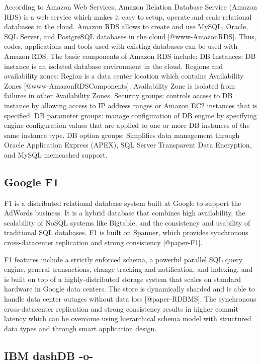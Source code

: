 According to Amazon Web Services, Amazon Relation Database Service
(Amazon RDS) is a web service which makes it easy to setup, operate
and scale relational databases in the cloud. Amazon RDS allows to
create and use MySQL, Oracle, SQL Server, and PostgreSQL databases in
the cloud [@www-AmazonRDS]. Thus, codes, applications and tools
used with existing databases can be used with Amazon RDS. The basic
components of Amazon RDS include: DB Instances: DB instance is an
isolated database environment in the cloud. Regions and availability
zones: Region is a data center location which contains Availability
Zones [@www-AmazonRDSComponents]. Availability Zone is isolated
from failures in other Availability Zones. Security groups: controls
access to DB instance by allowing access to IP address ranges or
Amazon EC2 instances that is specified. DB parameter groups: manage
configuration of DB engine by specifying engine configuration values
that are applied to one or more DB instances of the same instance
type. DB option groups: Simplifies data management through Oracle
Application Express (APEX), SQL Server Transparent Data Encryption,
and MySQL memcached support.



     
\subsection{Google F1}

F1 is a distributed relational database system built at Google to
support the AdWords business. It is a hybrid database that combines
high availability, the scalability of NoSQL systems like Bigtable, and
the consistency and usability of traditional SQL databases. F1 is
built on Spanner, which provides synchronous cross-datacenter
replication and strong consistency [@paper-F1].
     
F1 features include a strictly enforced schema, a powerful parallel
SQL query engine, general transactions, change tracking and
notification, and indexing, and is built on top of a
highly-distributed storage system that scales on standard hardware in
Google data centers. The store is dynamically sharded and is able to
handle data center outages without data loss [@paper-RDBMS]. The
synchronous cross-datacenter replication and strong consistency
results in higher commit latency which can be overcome using
hierarchical schema model with structured data types and through smart
application design.
     

\subsection{IBM dashDB -o-}

